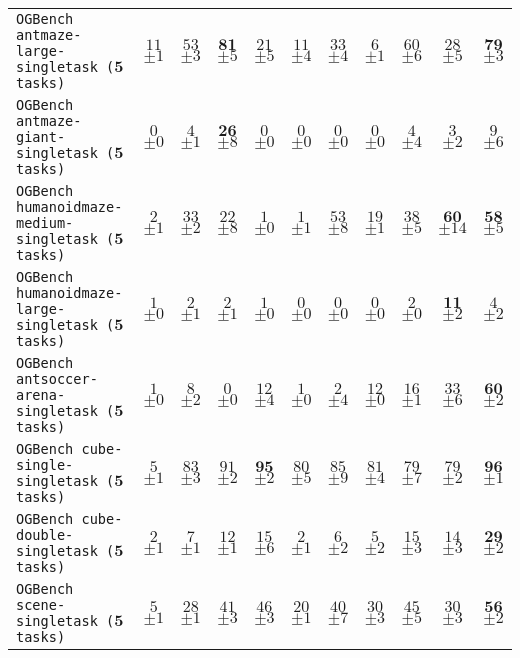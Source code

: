 \begin{table*}[t!]
{\begin{threeparttable}
\begin{tabular}{lcccccccccc}
\texttt{OGBench antmaze-large-singletask ($\mathbf{5}$ tasks)} & $11$ {\tiny $\pm 1$} & $53$ {\tiny $\pm 3$} & $\mathbf{81}$ {\tiny $\pm 5$} & $21$ {\tiny $\pm 5$} & $11$ {\tiny $\pm 4$} & $33$ {\tiny $\pm 4$} & $6$ {\tiny $\pm 1$} & $60$ {\tiny $\pm 6$} & $28$ {\tiny $\pm 5$} & $\mathbf{79}$ {\tiny $\pm 3$} \\
\texttt{OGBench antmaze-giant-singletask ($\mathbf{5}$ tasks)} & $0$ {\tiny $\pm 0$} & $4$ {\tiny $\pm 1$} & $\mathbf{26}$ {\tiny $\pm 8$} & $0$ {\tiny $\pm 0$} & $0$ {\tiny $\pm 0$} & $0$ {\tiny $\pm 0$} & $0$ {\tiny $\pm 0$} & $4$ {\tiny $\pm 4$} & $3$ {\tiny $\pm 2$} & $9$ {\tiny $\pm 6$} \\
\texttt{OGBench humanoidmaze-medium-singletask ($\mathbf{5}$ tasks)} & $2$ {\tiny $\pm 1$} & $33$ {\tiny $\pm 2$} & $22$ {\tiny $\pm 8$} & $1$ {\tiny $\pm 0$} & $1$ {\tiny $\pm 1$} & $53$ {\tiny $\pm 8$} & $19$ {\tiny $\pm 1$} & $38$ {\tiny $\pm 5$} & $\mathbf{60}$ {\tiny $\pm 14$} & $\mathbf{58}$ {\tiny $\pm 5$} \\
\texttt{OGBench humanoidmaze-large-singletask ($\mathbf{5}$ tasks)} & $1$ {\tiny $\pm 0$} & $2$ {\tiny $\pm 1$} & $2$ {\tiny $\pm 1$} & $1$ {\tiny $\pm 0$} & $0$ {\tiny $\pm 0$} & $0$ {\tiny $\pm 0$} & $0$ {\tiny $\pm 0$} & $2$ {\tiny $\pm 0$} & $\mathbf{11}$ {\tiny $\pm 2$} & $4$ {\tiny $\pm 2$} \\
\texttt{OGBench antsoccer-arena-singletask ($\mathbf{5}$ tasks)} & $1$ {\tiny $\pm 0$} & $8$ {\tiny $\pm 2$} & $0$ {\tiny $\pm 0$} & $12$ {\tiny $\pm 4$} & $1$ {\tiny $\pm 0$} & $2$ {\tiny $\pm 4$} & $12$ {\tiny $\pm 0$} & $16$ {\tiny $\pm 1$} & $33$ {\tiny $\pm 6$} & $\mathbf{60}$ {\tiny $\pm 2$} \\
\texttt{OGBench cube-single-singletask ($\mathbf{5}$ tasks)} & $5$ {\tiny $\pm 1$} & $83$ {\tiny $\pm 3$} & $91$ {\tiny $\pm 2$} & $\mathbf{95}$ {\tiny $\pm 2$} & $80$ {\tiny $\pm 5$} & $85$ {\tiny $\pm 9$} & $81$ {\tiny $\pm 4$} & $79$ {\tiny $\pm 7$} & $79$ {\tiny $\pm 2$} & $\mathbf{96}$ {\tiny $\pm 1$} \\
\texttt{OGBench cube-double-singletask ($\mathbf{5}$ tasks)} & $2$ {\tiny $\pm 1$} & $7$ {\tiny $\pm 1$} & $12$ {\tiny $\pm 1$} & $15$ {\tiny $\pm 6$} & $2$ {\tiny $\pm 1$} & $6$ {\tiny $\pm 2$} & $5$ {\tiny $\pm 2$} & $15$ {\tiny $\pm 3$} & $14$ {\tiny $\pm 3$} & $\mathbf{29}$ {\tiny $\pm 2$} \\
\texttt{OGBench scene-singletask ($\mathbf{5}$ tasks)} & $5$ {\tiny $\pm 1$} & $28$ {\tiny $\pm 1$} & $41$ {\tiny $\pm 3$} & $46$ {\tiny $\pm 3$} & $20$ {\tiny $\pm 1$} & $40$ {\tiny $\pm 7$} & $30$ {\tiny $\pm 3$} & $45$ {\tiny $\pm 5$} & $30$ {\tiny $\pm 3$} & $\mathbf{56}$ {\tiny $\pm 2$} \\

\end{tabular}
\end{threeparttable}}
\end{table*}
